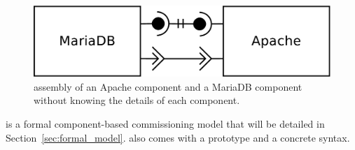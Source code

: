 \begin{figure}[tbp]
  \begin{center}
    \includegraphics[width=0.6\linewidth]{./images/simpleass.pdf}
  \end{center}
  \caption{\mad assembly of an Apache component and a MariaDB
    component without knowing the details of each component.}
  \label{fig:simple}
\end{figure}

\mad is a formal component-based commissioning model that will be
detailed in Section~\ref{sec:formal_model}. \mad also comes with a
prototype and a concrete syntax.






